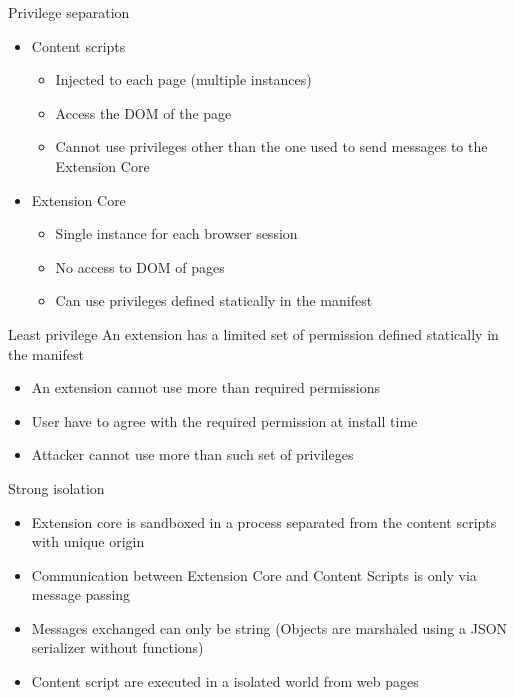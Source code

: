 \documentclass[11pt]{beamer}
\begin{document}
\begin{frame}{Privilege separation}
\begin{itemize}
\item Content scripts
\begin{itemize}
\item Injected to each page (multiple instances)
\item Access the DOM of the page
\item Cannot use privileges other than the one used to send messages to the Extension Core
\end{itemize}
\item Extension Core
\begin{itemize}
\item Single instance for each browser session
\item No access to DOM of pages
\item Can use privileges defined statically in the manifest
\end{itemize}
\end{itemize}
\end{frame}

\begin{frame}{Least privilege}
An extension has a limited set of permission defined statically in the manifest
\begin{itemize}
\item An extension cannot use more than required permissions
\item User have to agree with the required permission at install time
\item Attacker cannot use more than such set of privileges
\end{itemize}
\end{frame}

\begin{frame}{Strong isolation}
\begin{itemize}
\item Extension core is sandboxed in a process separated from the content scripts with unique origin
\item Communication between Extension Core and Content Scripts is only via message passing
\item Messages exchanged can only be string (Objects are marshaled using a JSON serializer without functions)
\item Content script are executed in a isolated world from web pages
\end{itemize}
\end{frame}
\end{document}
